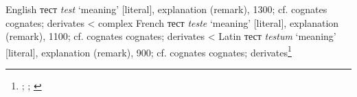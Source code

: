 \begin{etymology}\label{ety:tester}
English {тест} \textit{test} `meaning' [literal], explanation (remark), 1300; cf. cognates cognates; derivates
< complex French {тест} \textit{teste} `meaning' [literal], explanation (remark), 1100; cf. cognates cognates; derivates
< Latin {тест} \textit{testum} `meaning' [literal], explanation (remark), 900; cf. cognates cognates; derivates\footnote{\textcite[test1]{oed}; \textcite[test2]{oed}; \textcite[test2]{oed}}
\end{etymology}